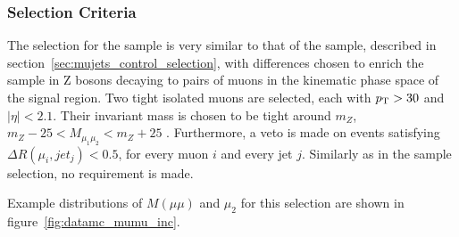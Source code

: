 \subsubsection{Selection Criteria}
The selection for the \mmj sample is very similar to that of the \mj sample, 
described in section~\ref{sec:mujets_control_selection}, with differences chosen
to enrich the sample in Z bosons decaying to pairs of muons in the kinematic 
phase space of the signal region. Two tight isolated muons are selected, each 
with ${p_{\text T}} > 30$ \gev and $|\eta| < 2.1$. Their invariant mass is chosen to be
tight around $m_Z$, $m_Z - 25 < M_{\mu_1\mu_2} < m_Z + 25$ \gev. Furthermore, a 
veto is made on events satisfying $\Delta R(\mu_i, jet_j) < 0.5$, for every muon 
$i$ and every jet $j$. Similarly as in the \mj sample selection, no \alphat
requirement is made.

Example distributions of $M(\mu\mu)$ and $\mu_2$ \Pt for this selection are
shown in figure~\ref{fig:datamc_mumu_inc}.

